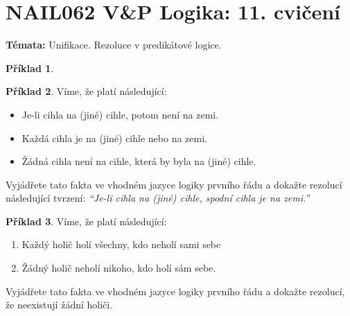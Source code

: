 \documentclass[a4paper]{article}
\theoremstyle{definition}
\newtheorem{problem}{Příklad}
\begin{document}
\section*{NAIL062 V\&P Logika: 11. cvičení}


\textbf{Témata:}
Unifikace. Rezoluce v predikátové logice.


\medskip\begin{problem}
 
\end{problem}


\medskip\begin{problem} Víme, že platí následující:
    \begin{itemize}\it
        \item Je-li cihla na (jiné) cihle, potom není na zemi.
        \item Každá cihla je na (jiné) cihle nebo na zemi.
        \item Žádná cihla není na cihle, která by byla na (jiné) cihle.
    \end{itemize}
    Vyjádřete tato fakta ve vhodném jazyce logiky prvního řádu a dokažte rezolucí následující tvrzení: {\it ``Je-li cihla na (jiné) cihle, spodní cihla je na zemi.''}
\end{problem}
        
    
\medskip\begin{problem} Víme, že platí následující:
    \begin{enumerate}\it
        \item Každý holič holí všechny, kdo neholí sami sebe
        \item Žádný holič neholí nikoho, kdo holí sám sebe.
    \end{enumerate}
    Vyjádřete tato fakta ve vhodném jazyce logiky prvního řádu a dokažte rezolucí, že neexistují žádní holiči.
\end{problem}
\end{document}
